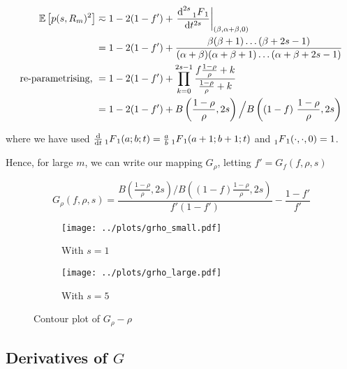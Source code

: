 \documentclass[american, abstract=on]{scrartcl}
\theoremstyle{plain}
\newcommand{\E}{\mathbb{E}}
\begin{document}
\begin{equation}
    \begin{split}
        \E \left[p(s, R_m)^2\right] &\eqsim 1 - 2(1 - f') + \left.\frac{\text{d}^{2s} \prescript{}{1}{F}_1}{\text{d}t^{2s}} \right\rvert_{(\beta, \alpha + \beta, 0)} \\
        &= 1 - 2(1 - f') + \frac{\beta(\beta + 1)\ldots(\beta + 2s - 1)}{(\alpha + \beta)(\alpha + \beta + 1) \ldots (\alpha + \beta + 2s - 1)} \\
        \text{re-parametrising, } &= 1 - 2(1 - f') + \prod^{2s - 1}_{k = 0} \frac{f \frac{1 - \rho}{\rho} + k}{\frac{1 - \rho}{\rho} + k} \\
        &= 1 - 2(1 - f') + B\left(\frac{1 - \rho}{\rho}, 2s \right) \Big/ B\left((1 - f) \ \frac{1 - \rho}{\rho}, 2s \right)
    \end{split}
\end{equation}

where we have used $\frac{\text{d}}{\text{d}t} \prescript{}{1}{F}_1(a; b; t) = \frac{a}{b} \prescript{}{1}{F}_1(a + 1; b + 1; t)$ and $\prescript{}{1}{F}_1(\cdot, \cdot, 0) = 1$.

Hence, for large $m$, we can write our mapping $G_{\rho}$, letting $f' = G_f(f, \rho, s)$


\begin{equation}
    G_{\rho}(f, \rho, s) = \frac{ B\left(\frac{1 - \rho}{\rho}, 2s \right) \Big/ B\left((1 - f) \frac{1 - \rho}{\rho}, 2s \right)}{f' (1 - f')} - \frac{1 - f'}{f'}
\end{equation}


\begin{figure}[H]
    \centering
    \begin{subfigure}{.5\textwidth}
      \centering
      \texttt{[image: ../plots/grho\_small.pdf]} 
      \caption{With $s = 1$}
      \label{fig:grho:small}  
    \end{subfigure}%
    \begin{subfigure}{.5\textwidth}
      \centering
      \texttt{[image: ../plots/grho\_large.pdf]}       
      \caption{With $s = 5$}
      \label{fig:grho:large}
    \end{subfigure}
    \caption{Contour plot of $G_\rho - \rho$}
    \label{fig:grho}
  \end{figure}

\subsection[Derivatives of map]{Derivatives of $G$}
\end{document}
